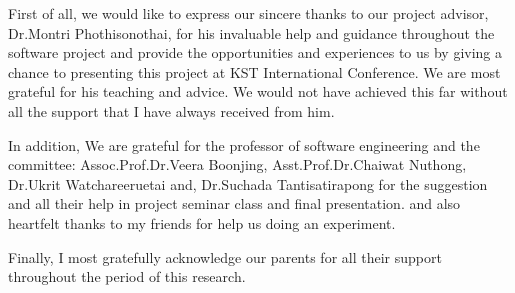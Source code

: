 \cleardoublepage


\begin{acknowledgements}

\hspace{1.5cm}First of all, we  would like to express our sincere thanks to our project advisor, Dr.Montri Phothisonothai, for his invaluable help and guidance throughout the software project and  provide the opportunities and experiences to us by giving a chance to presenting this project at KST International Conference. We are most grateful for his teaching and advice. We would not have achieved this far without all the support that I have always received from him.

\hspace{1.5cm}In addition, We are grateful for the professor of software engineering and the committee: 
Assoc.Prof.Dr.Veera Boonjing, 
Asst.Prof.Dr.Chaiwat Nuthong, 
Dr.Ukrit Watchareeruetai and,  
Dr.Suchada Tantisatirapong
for the suggestion and all their help in project seminar class and final presentation. 
and also heartfelt thanks to my friends for help us doing an experiment.

\hspace{1.5cm}Finally, I most gratefully acknowledge our parents for all their support throughout the period of this research.

\end{acknowledgements}